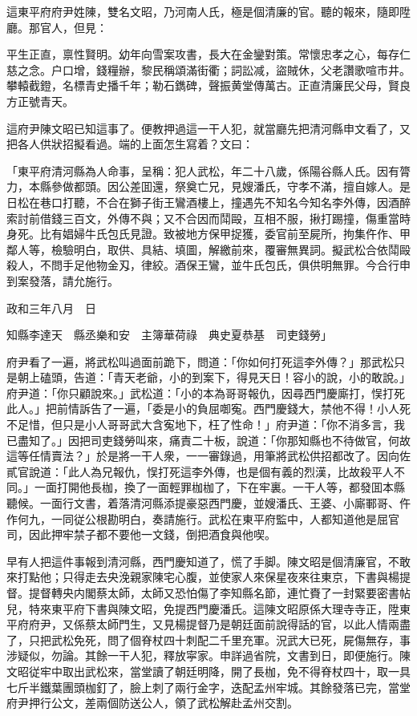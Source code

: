 這東平府府尹姓陳，雙名文昭，乃河南人氏，極是個清廉的官。聽的報來，隨即陞廳。那官人，但見：

平生正直，禀性賢明。幼年向雪案攻書，長大在金鑾對策。常懷忠孝之心，每存仁慈之念。户口增，錢糧辦，黎民稱頌滿街衢；詞訟减，盜賊休，父老讚歌喧市井。攀轅截鐙，名標青史播千年；勒石鐫碑，聲振黄堂傳萬古。正直清廉民父母，賢良方正號青天。

這府尹陳文昭已知這事了。便教押過這一干人犯，就當廳先把清河縣申文看了，又把各人供狀招擬看過。端的上面怎生寫着？文曰：

「東平府清河縣為人命事，呈稱：犯人武松，年二十八歲，係陽谷縣人氏。因有膂力，本縣參做都頭。因公差囬還，祭奠亡兄，見嫂潘氏，守孝不滿，擅自嫁人。是日松在巷口打聽，不合在獅子街王鸞酒樓上，撞遇先不知名今知名李外傳，因酒醉索討前借錢三百文，外傳不與；又不合因而鬦毆，互相不服，揪打踢撞，傷重當時身死。比有娼婦牛氏包氏見證。致被地方保甲捉獲，委官前至屍所，拘集仵作、甲鄰人等，檢驗明白，取供、具結、填圖，解繳前來，覆審無異詞。擬武松合依鬦毆殺人，不問手足他物金刄，律絞。酒保王鸞，並牛氏包氏，俱供明無罪。今合行申到案發落，請允施行。

政和三年八月　日　

知縣李達天　縣丞樂和安　主簿華荷祿　典史夏恭基　司吏錢勞」

府尹看了一遍，將武松叫過面前跪下，問道：「你如何打死這李外傳？」那武松只是朝上磕頭，告道：「青天老爺，小的到案下，得見天日！容小的說，小的敢說。」府尹道：「你只顧說來。」武松道：「小的本為哥哥報仇，因尋西門慶廝打，悮打死此人。」把前情訴告了一遍，「委是小的負屈啣寃。西門慶錢大，禁他不得！小人死不足惜，但只是小人哥哥武大含寃地下，枉了性命！」府尹道：「你不消多言，我已盡知了。」因把司吏錢勞叫來，痛責二十板，說道：「你那知縣也不待做官，何故這等任情賣法？」於是將一干人衆，一一審錄過，用筆將武松供招都改了。因向佐貳官說道：「此人為兄報仇，悮打死這李外傳，也是個有義的烈漢，比故殺平人不同。」一面打開他長枷，換了一面輕罪枷枷了，下在牢裏。一干人等，都發囬本縣聽候。一面行文書，着落清河縣添提豪惡西門慶，並嫂潘氏、王婆、小廝鄆哥、仵作何九，一同従公根勘明白，奏請施行。武松在東平府監中，人都知道他是屈官司，因此押牢禁子都不要他一文錢，倒把酒食與他喫。

早有人把這件事報到清河縣，西門慶知道了，慌了手脚。陳文昭是個清廉官，不敢來打點他；只得走去央浼親家陳宅心腹，並使家人來保星夜來往東京，下書與楊提督。提督轉央内閣蔡太師，太師又恐怕傷了李知縣名節，連忙賚了一封緊要密書帖兒，特來東平府下書與陳文昭，免提西門慶潘氏。這陳文昭原係大理寺寺正，陞東平府府尹，又係蔡太師門生，又見楊提督乃是朝廷面前說得話的官，以此人情兩盡了，只把武松免死，問了個脊杖四十刺配二千里充軍。況武大已死，屍傷無存，事涉疑似，勿論。其餘一干人犯，釋放寜家。申詳過省院，文書到日，即便施行。陳文昭従牢中取出武松來，當堂讀了朝廷明降，開了長枷，免不得脊杖四十，取一具七斤半鐵葉團頭枷釘了，臉上刺了兩行金字，迭配孟州牢城。其餘發落已完，當堂府尹押行公文，差兩個防送公人，領了武松解赴孟州交割。


